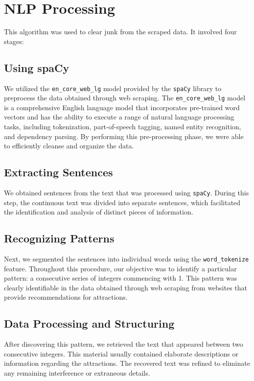 \documentclass[conference]{IEEEtran}
\begin{document}
\section{NLP Processing}

    This algorithm was used to clear junk from the scraped data. It involved four stages:

    \subsection{Using spaCy}
    We utilized the \texttt{en\_core\_web\_lg} model provided by the \texttt{spaCy} library to preprocess the data obtained through web scraping. The \texttt{en\_core\_web\_lg} model is a comprehensive English language model that incorporates pre-trained word vectors and has the ability to execute a range of natural language processing tasks, including tokenization, part-of-speech tagging, named entity recognition, and dependency parsing. By performing this pre-processing phase, we were able to efficiently cleanse and organize the data.

    \subsection{Extracting Sentences}
    We obtained sentences from the text that was processed using \texttt{spaCy}. During this step, the continuous text was divided into separate sentences, which facilitated the identification and analysis of distinct pieces of information.

    \subsection{Recognizing Patterns}
    Next, we segmented the sentences into individual words using the \texttt{word\_tokenize} feature. Throughout this procedure, our objective was to identify a particular pattern: a consecutive series of integers commencing with 1. This pattern was clearly identifiable in the data obtained through web scraping from websites that provide recommendations for attractions.

    \subsection{Data Processing and Structuring}
    After discovering this pattern, we retrieved the text that appeared between two consecutive integers. This material usually contained elaborate descriptions or information regarding the attractions. The recovered text was refined to eliminate any remaining interference or extraneous details.
\end{document}
